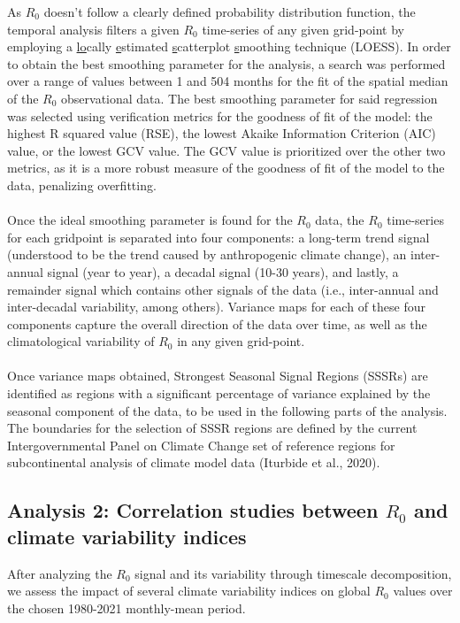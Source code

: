 \documentclass[fleqn,10pt]{wlscirep}
\begin{document}
  As $R_0$ doesn't follow a clearly defined probability distribution function, the temporal analysis filters a given $R_0$ time-series of any given grid-point by employing a \underline{lo}cally \underline{e}stimated \underline{s}catterplot \underline{s}moothing technique (LOESS). In order to obtain the best smoothing parameter for the analysis, a search was performed over a range of values between 1 and 504 months for the fit of the spatial median of the $R_0$ observational data. The best smoothing parameter for said regression was selected using verification metrics for the goodness of fit of the model: the highest R squared value (RSE), the lowest Akaike Information Criterion (AIC) value, or the lowest GCV value. The GCV value is prioritized over the other two metrics, as it is a more robust measure of the goodness of fit of the model to the data, penalizing overfitting.
  \\
  \\
  Once the ideal smoothing parameter is found for the $R_0$ data, the $R_0$ time-series for each gridpoint is separated into four components: a long-term trend signal (understood to be the trend caused by anthropogenic climate change), an inter-annual signal (year to year), a decadal signal (10-30 years), and lastly, a remainder signal which contains other signals of the data (i.e., inter-annual and inter-decadal variability, among others). Variance maps for each of these four components capture the overall direction of the data over time, as well as the climatological variability of $R_0$ in any given grid-point. 
  \\
  \\
  Once variance maps obtained, Strongest Seasonal Signal Regions (SSSRs) are identified as regions with a significant percentage of variance explained by the seasonal component of the data, to be used in the following parts of the analysis. The boundaries for the selection of SSSR regions are defined by the current Intergovernmental Panel on Climate Change set of reference regions for subcontinental analysis of climate model data (Iturbide et al., 2020).  

  \subsection{Analysis 2: Correlation studies between $R_0$ and climate variability indices} \label{sec-methods-2}

  After analyzing the $R_0$ signal and its variability through timescale decomposition, we assess the impact of several climate variability indices on global $R_0$ values over the chosen 1980-2021 monthly-mean period.  
\end{document}
